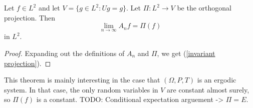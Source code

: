 \begin{theorem}
Let $f \in L^2$ and let $V = \{g \in L^2: Ug = g\}$.
Let $\Pi: L^2 \to V$ be the orthogonal projection.
Then
$$\lim_{n \to \infty} A_nf = \Pi(f)$$
in $L^2$.
\end{theorem}
\begin{proof}
Expanding out the definitions of $A_n$ and $\Pi$, we get (\ref{invariant projection}).
\end{proof}

This theorem is mainly interesting in the case that $(\Omega, P, T)$ is an ergodic system.
In that case, the only random variables in $V$ are constant almost surely, so $\Pi(f)$ is a constant.
TODO: Conditional expectation arguement -> $\Pi = E$.
